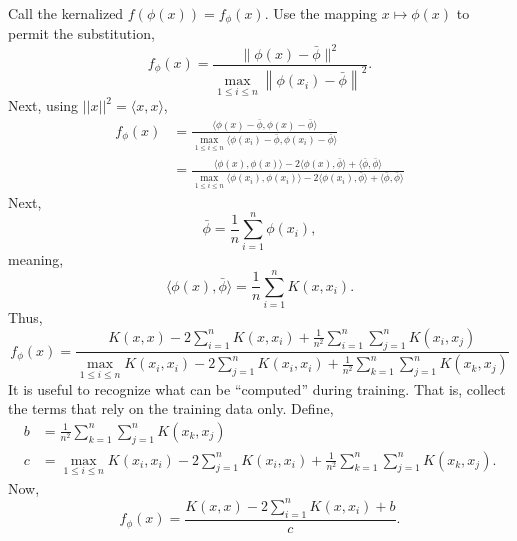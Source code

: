 \documentclass[12pt]{article}
\begin{document}
Call the kernalized $f(\phi(x)) = f_\phi(x)$. Use the mapping $x \mapsto \phi(x)$ to permit the substitution,
\begin{equation}
f_\phi(x)=\frac{\|\phi(x)-\bar{\phi}\|^{2}}{\max _{1 \leq i \leq n}\left\|\phi(x_{i})-\bar{\phi}\right\|^{2}}.
\end{equation}
Next, using $||x||^2 = \langle x, x \rangle$,
\begin{equation}
\begin{aligned}
f_\phi (x) &= \frac{\langle \phi(x) - \bar{\phi},   \phi(x) - \bar{\phi}\rangle}{ \max _{1 \leq i \leq n} \langle \phi(x_i) - \bar{\phi},   \phi(x_i) - \bar{\phi}\rangle} \\
&= \frac{\langle \phi(x), \phi(x) \rangle - 2 \langle \phi(x), \bar{\phi} \rangle + \langle \bar{\phi}, \bar{\phi} \rangle}{\max _{1 \leq i \leq n}  \langle \phi(x_i), \phi(x_i) \rangle - 2 \langle \phi(x_i), \bar{\phi} \rangle + \langle \bar{\phi}, \bar{\phi} \rangle}
\end{aligned}
\end{equation}
Next,
\begin{equation}
\bar{\phi} = \frac{1}{n} \sum_{i=1}^{n} \phi(x_i),
\end{equation}
meaning,
\begin{equation}
\langle \phi(x),  \bar{\phi} \rangle = \frac{1}{n} \sum_{i=1}^{n} K(x, x_i).
\end{equation}
Thus,
\begin{equation}
f_\phi(x) =\frac{K(x, x) - 2 \sum_{i=1}^{n} K(x, x_i) + \frac{1}{n^2} \sum_{i=1}^{n} \sum_{j=1}^{n} K(x_i, x_j)}{\max _{1 \leq i \leq n} K(x_i, x_i) - 2 \sum_{j=1}^{n} K(x_i, x_i) + \frac{1}{n^2} \sum_{k=1}^{n} \sum_{j=1}^{n} K(x_k, x_j)}
\end{equation}
It is useful to recognize what can be ``computed'' during training. That is, collect the terms that rely on the training data only. Define,
\begin{equation}
\begin{aligned}
b &=  \frac{1}{n^2} \sum_{k=1}^{n} \sum_{j=1}^{n} K(x_k, x_j) \\
c &= {\max _{1 \leq i \leq n} K(x_i, x_i) - 2 \sum_{j=1}^{n} K(x_i, x_i) + \frac{1}{n^2} \sum_{k=1}^{n} \sum_{j=1}^{n} K(x_k, x_j)}.
\end{aligned}
\end{equation}
Now,
\begin{equation}
f_\phi(x) =\frac{K(x, x) - 2 \sum_{i=1}^{n} K(x, x_i) + b}{c}.
\end{equation}
\end{document}
